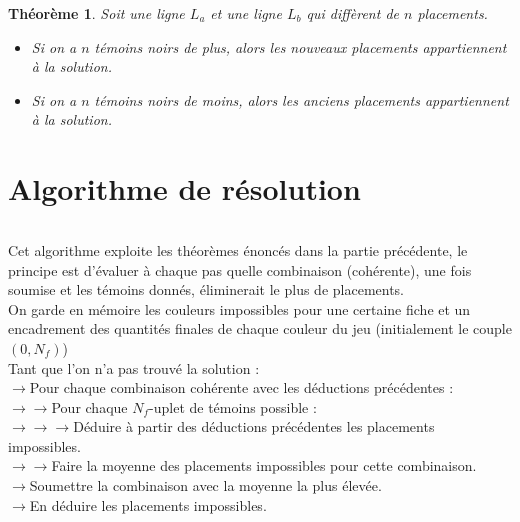 \documentclass[]{article}
\newtheorem{mythm}{Théorème}
\begin{document}
\begin{mythm}
	Soit une ligne $L_a$ et une ligne $L_b$ qui diffèrent de $n$ placements.
	\begin{itemize}
		\item Si on a $n$ témoins noirs de plus, alors les nouveaux placements appartiennent à la solution.
		\item Si on a $n$ témoins noirs de moins, alors les anciens placements appartiennent à la solution.
	\end{itemize} 
\end{mythm}

\part*{Algorithme de résolution}

\paragraph*{}
Cet algorithme exploite les théorèmes énoncés dans la partie précédente, le principe est d'évaluer à chaque pas quelle combinaison (cohérente), une fois soumise et les témoins donnés, éliminerait le plus de placements.
\\
On garde en mémoire les couleurs impossibles pour une certaine fiche et un encadrement des quantités finales de chaque couleur du jeu (initialement le couple $(0, N_f)$)
\\
Tant que l'on n'a pas trouvé la solution :\\
	$\rightarrow$Pour chaque combinaison cohérente avec les déductions précédentes :\\
		$\rightarrow \rightarrow$Pour chaque $N_f$-uplet de témoins possible :\\
			$\rightarrow \rightarrow \rightarrow$Déduire à partir des déductions précédentes les placements impossibles.\\
		$\rightarrow \rightarrow$Faire la moyenne des placements impossibles pour cette combinaison.\\
	$\rightarrow$Soumettre la combinaison avec la moyenne la plus élevée.\\
	$\rightarrow$En déduire les placements impossibles.\\
\end{document}
